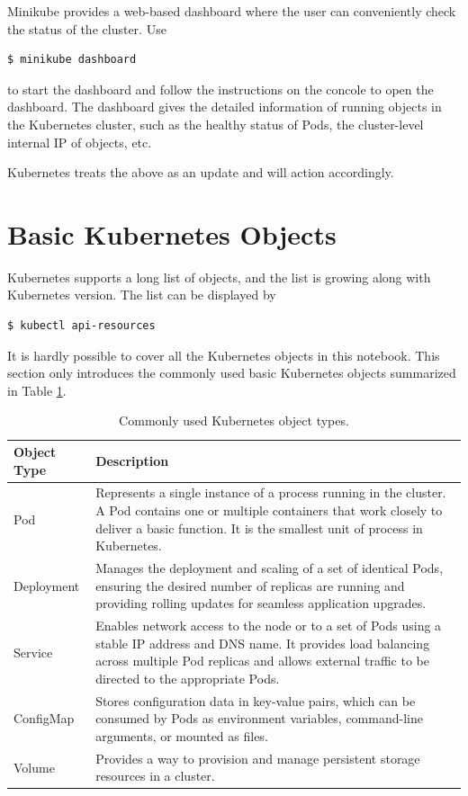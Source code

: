 Minikube provides a web-based dashboard where the user can conveniently check the status of the cluster. Use
\begin{lstlisting}
$ minikube dashboard
\end{lstlisting} 
to start the dashboard and follow the instructions on the concole to open the dashboard. The dashboard gives the detailed information of running objects in the Kubernetes cluster, such as the healthy status of Pods, the cluster-level internal IP of objects, etc.


Kubernetes treats the above as an update and will action accordingly.

\section{Basic Kubernetes Objects} \label{ch:vac:sec:objects}

Kubernetes supports a long list of objects, and the list is growing along with Kubernetes version. The list can be displayed by
\begin{lstlisting}
$ kubectl api-resources
\end{lstlisting}

It is hardly possible to cover all the Kubernetes objects in this notebook. This section only introduces the commonly used basic Kubernetes objects summarized in Table \ref{ch:vac:tab:objtype}.
\begin{table}[!htb]
	\centering
	\caption{Commonly used Kubernetes object types.} \label{ch:vac:tab:objtype}
	\begin{tabularx}{\textwidth}{lX}
		\hline
		Object Type & Description \\
		\hline
		Pod & Represents a single instance of a process running in the cluster. A Pod contains one or multiple containers that work closely to deliver a basic function. It is the smallest unit of process in Kubernetes. \\ \hline
		Deployment & Manages the deployment and scaling of a set of identical Pods, ensuring the desired number of replicas are running and providing rolling updates for seamless application upgrades. \\ \hline
		Service & Enables network access to the node or to a set of Pods using a stable IP address and DNS name. It provides load balancing across multiple Pod replicas and allows external traffic to be directed to the appropriate Pods. \\ \hline
		ConfigMap & Stores configuration data in key-value pairs, which can be consumed by Pods as environment variables, command-line arguments, or mounted as files. \\ \hline
		Volume & Provides a way to provision and manage persistent storage resources in a cluster. \\
		\hline
	\end{tabularx}
\end{table}

